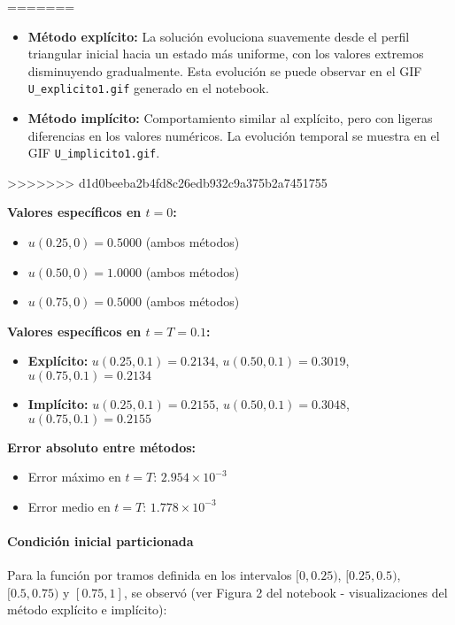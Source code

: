 \documentclass[12pt,a4paper]{article}
\begin{document}
=======

\begin{itemize}
    \item \textbf{Método explícito:} La solución evoluciona suavemente desde el perfil triangular inicial hacia un estado más uniforme, con los valores extremos disminuyendo gradualmente. Esta evolución se puede observar en el GIF \texttt{U\_explicito1.gif} generado en el notebook.
    \item \textbf{Método implícito:} Comportamiento similar al explícito, pero con ligeras diferencias en los valores numéricos. La evolución temporal se muestra en el GIF \texttt{U\_implicito1.gif}.
\end{itemize}
>>>>>>> d1d0beeba2b4fd8c26edb932c9a375b2a7451755

\textbf{Valores específicos en $t = 0$:}
\begin{itemize}
    \item $u(0.25, 0) = 0.5000$ (ambos métodos)
    \item $u(0.50, 0) = 1.0000$ (ambos métodos) 
    \item $u(0.75, 0) = 0.5000$ (ambos métodos)
\end{itemize}

\textbf{Valores específicos en $t = T = 0.1$:}
\begin{itemize}
    \item \textbf{Explícito:} $u(0.25, 0.1) = 0.2134$, $u(0.50, 0.1) = 0.3019$, $u(0.75, 0.1) = 0.2134$
    \item \textbf{Implícito:} $u(0.25, 0.1) = 0.2155$, $u(0.50, 0.1) = 0.3048$, $u(0.75, 0.1) = 0.2155$
\end{itemize}

\textbf{Error absoluto entre métodos:}
\begin{itemize}
    \item Error máximo en $t = T$: $2.954 \times 10^{-3}$
    \item Error medio en $t = T$: $1.778 \times 10^{-3}$
\end{itemize}

\paragraph{Condición inicial particionada}

Para la función por tramos definida en los intervalos $[0, 0.25)$, $[0.25, 0.5)$, $[0.5, 0.75)$ y $[0.75, 1]$, se observó (ver Figura 2 del notebook - visualizaciones del método explícito e implícito):
\end{document}
